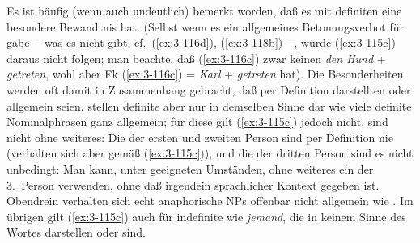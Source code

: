 \documentclass[output=paper]{langsci/langscibook}
\begin{document}
Es ist häufig (wenn auch undeutlich) bemerkt worden, daß es mit definiten  eine besondere Bewandtnis hat. (Selbst wenn
es ein allgemeines Betonungsverbot für  gäbe~-- was es nicht gibt, cf.\ (\ref{ex:3-116d}), (\ref{ex:3-118b})~--, würde (\ref{ex:3-115c}) daraus nicht
folgen; man beachte, daß (\ref{ex:3-116c}) zwar keinen  \textit{den Hund} + \textit{getreten}, wohl aber Fk (\ref{ex:3-116c}) = \textit{Karl} + \textit{getreten} hat). Die Besonderheiten werden oft damit in Zusammenhang gebracht, daß  per Definition  darstellten oder allgemein  seien.  stellen definite  aber nur in demselben Sinne dar wie viele definite Nominalphrasen ganz allgemein; für diese gilt (\ref{ex:3-115c}) jedoch nicht.  sind  nicht ohne weiteres: Die  der ersten und zweiten Person sind per Definition nie  (verhalten sich aber gemäß (\ref{ex:3-115c})), und die der dritten Person sind es nicht unbedingt: Man kann, unter geeigneten Umständen, ohne weiteres ein  der 3.\ Person verwenden, ohne daß irgendein sprachlicher Kontext gegeben ist. Obendrein verhalten sich echt anaphorische NPs offenbar nicht allgemein wie . Im übrigen gilt (\ref{ex:3-115c}) auch für indefinite  wie \textit{jemand}, die in keinem Sinne des Wortes  darstellen oder  sind.
\end{document}
